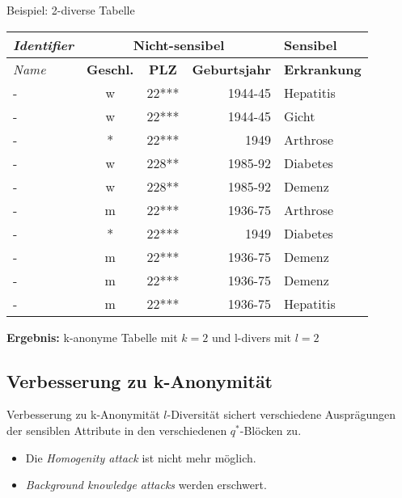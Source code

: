 \begin{frame}{Beispiel: 2-diverse Tabelle}
	\begin{center}
			\begin{tabular}{|l|c|c|r|l|}
		\hline \textit{Identifier} & \multicolumn{3}{c|}{\textbf{Nicht-sensibel}} & \textbf{Sensibel} \\ 
		\hline \textit{Name} & \textbf{Geschl.} & \textbf{PLZ} & \textbf{Geburtsjahr} & \textbf{Erkrankung} \\ \hline
		\hline \rowcolor{svshellblau1!30} 	- & w & 22*** & 1944-45 & Hepatitis \\ 
		\hline \rowcolor{svshellblau1!30}	- & w & 22*** & 1944-45 & Gicht \\ 
		\hline \rowcolor{svsgrau1!30} 		- & * & 22*** & 1949 & Arthrose \\ 
		\hline \rowcolor{svshellblau2!30} 	- & w & 228** & 1985-92 & Diabetes \\
		\hline \rowcolor{svshellblau2!30} 	- & w & 228** & 1985-92 & Demenz \\  
		\hline \rowcolor{svsrot!30} 		- & m & 22*** & 1936-75 & Arthrose \\ 
		\hline \rowcolor{svsgrau1!30} 		- & * & 22*** & 1949 & Diabetes \\ 
		\hline \rowcolor{svsrot!30} 		- & m & 22*** & 1936-75 & Demenz \\ 
		\hline \rowcolor{svsrot!30} 		- & m & 22*** & 1936-75 & Demenz \\ 
		\hline \rowcolor{svsrot!30} 		- & m & 22*** & 1936-75 & Hepatitis \\ 
		\hline 
		\end{tabular}
		\vspace{0.5cm}
        
		\textbf{Ergebnis:} k-anonyme Tabelle mit \(k=2\) und l-divers mit \(l=2\)
	\end{center}
\end{frame}


\subsection{Verbesserung zu k-Anonymität}

\begin{frame}{Verbesserung zu k-Anonymität}
	$l$-Diversität sichert verschiedene Ausprägungen der sensiblen Attribute in den verschiedenen \(q^*\)-Blöcken zu.
	
	\begin{itemize}
	\item Die \textit{Homogenity attack} ist nicht mehr möglich.
	\item \textit{Background knowledge attacks} werden erschwert.
	\end{itemize}
	
\end{frame}


